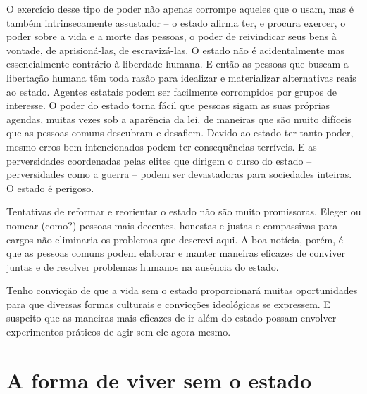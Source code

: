 O exercício desse tipo de poder não apenas corrompe aqueles que o usam, mas é também intrinsecamente assustador -- o estado afirma ter, e procura exercer, o poder sobre a vida e a morte das pessoas, o poder de reivindicar seus bens à vontade, de aprisioná-las, de escravizá-las. O estado não é acidentalmente mas essencialmente contrário à liberdade humana. E então as pessoas que buscam a libertação humana têm toda razão para idealizar e materializar alternativas reais ao estado. Agentes estatais podem ser facilmente corrompidos por grupos de interesse. O poder do estado torna fácil que pessoas sigam as suas próprias agendas, muitas vezes sob a aparência da lei, de maneiras que são muito difíceis que as pessoas comuns descubram e desafiem. Devido ao estado ter tanto poder, mesmo erros bem-intencionados podem ter consequências terríveis. E as perversidades coordenadas pelas elites que dirigem o curso do estado -- perversidades como a guerra -- podem ser devastadoras para sociedades inteiras. O estado é perigoso.

Tentativas de reformar e reorientar o estado não são muito promissoras. Eleger ou nomear (como?) pessoas mais decentes, honestas e justas e compassivas para cargos não eliminaria os problemas que descrevi aqui. A boa notícia, porém, é que as pessoas comuns podem elaborar e manter maneiras eficazes de conviver juntas e de resolver problemas humanos na ausência do estado.

Tenho convicção de que a vida sem o estado proporcionará muitas oportunidades para que diversas formas culturais e convicções ideológicas se expressem. E suspeito que as maneiras mais eficazes de ir além do estado possam envolver experimentos práticos de agir sem ele agora mesmo.

\section{A forma de viver sem o estado}

